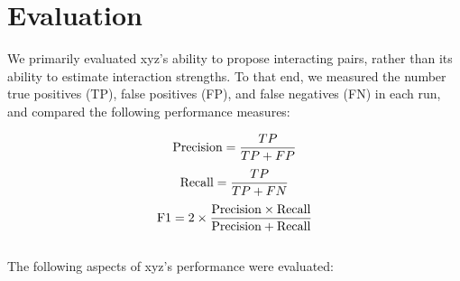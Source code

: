 \section{Evaluation}

We primarily evaluated xyz's ability to propose interacting pairs, rather than its ability to estimate interaction strengths. To that end, we measured the number true positives (TP), false positives (FP), and false negatives (FN) in each run, and compared the following performance measures:

$$\textnormal{Precision} = \frac{TP}{TP + FP}$$
$$\textnormal{Recall} = \frac{TP}{TP + FN}$$
$$\textnormal{F1} = 2 \times \frac{\textnormal{Precision} \times \textnormal{Recall}}{\textnormal{Precision} + \textnormal{Recall}}$$
~\\
The following aspects of xyz's performance were evaluated:


